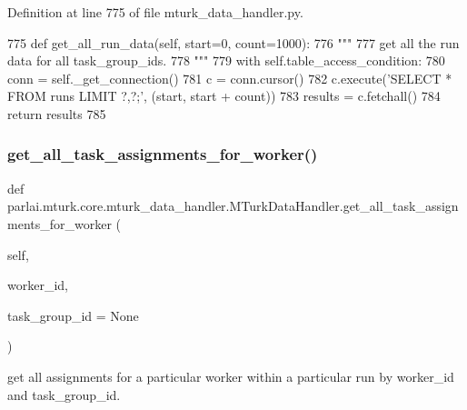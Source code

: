 Definition at line 775 of file mturk\+\_\+data\+\_\+handler.\+py.


\begin{DoxyCode}
775     \textcolor{keyword}{def }get\_all\_run\_data(self, start=0, count=1000):
776         \textcolor{stringliteral}{"""}
777 \textcolor{stringliteral}{        get all the run data for all task\_group\_ids.}
778 \textcolor{stringliteral}{        """}
779         with self.table\_access\_condition:
780             conn = self.\_get\_connection()
781             c = conn.cursor()
782             c.execute(\textcolor{stringliteral}{'SELECT * FROM runs LIMIT ?,?;'}, (start, start + count))
783             results = c.fetchall()
784             \textcolor{keywordflow}{return} results
785 
\end{DoxyCode}
\mbox{\label{classparlai_1_1mturk_1_1core_1_1mturk__data__handler_1_1MTurkDataHandler_a6ad4b37c9393559d29d7e0e7a1b93027}} 
\subsubsection{\texorpdfstring{get\+\_\+all\+\_\+task\+\_\+assignments\+\_\+for\+\_\+worker()}{get\_all\_task\_assignments\_for\_worker()}}
{\footnotesize\ttfamily def parlai.\+mturk.\+core.\+mturk\+\_\+data\+\_\+handler.\+M\+Turk\+Data\+Handler.\+get\+\_\+all\+\_\+task\+\_\+assignments\+\_\+for\+\_\+worker (\begin{DoxyParamCaption}\item[{}]{self,  }\item[{}]{worker\+\_\+id,  }\item[{}]{task\+\_\+group\+\_\+id = {\ttfamily None} }\end{DoxyParamCaption})}

\begin{DoxyVerb}get all assignments for a particular worker within a particular run by worker_id
and task_group_id.
\end{DoxyVerb}
 

